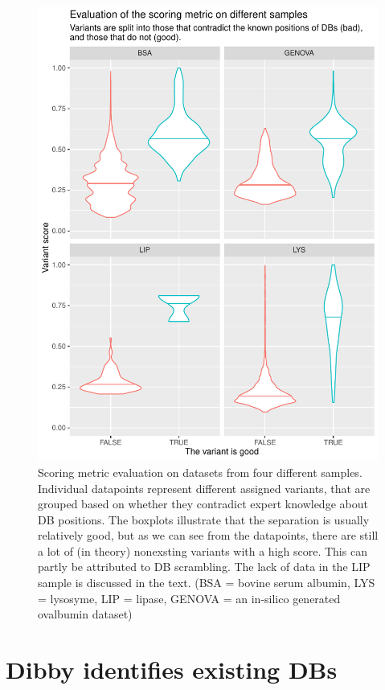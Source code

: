 \begin{figure}
  \centering
  \includegraphics[width=1\linewidth]{img/scoring-metric-evaluation.pdf}
  \caption{Scoring metric evaluation on datasets from four different samples. Individual datapoints represent different assigned variants, that are grouped based on whether they contradict expert knowledge about DB positions. The boxplots illustrate that the separation is usually relatively good, but as we can see from the datapoints, there are still a lot of (in theory) nonexsting variants with a high score. This can partly be attributed to DB scrambling. The lack of data in the LIP sample is discussed in the text. (BSA = bovine serum albumin, LYS = lysosyme, LIP = lipase, GENOVA = an in-silico generated ovalbumin dataset)}\label{fig:scoring-metric}
\end{figure}

\section{Dibby identifies existing DBs}

